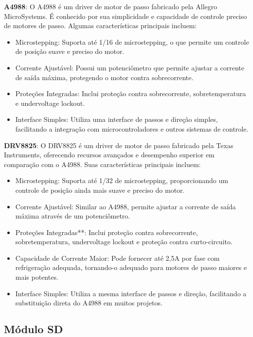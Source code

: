 \textbf{A4988}: O A4988 é um driver de motor de passo fabricado pela Allegro MicroSystems. É conhecido por sua simplicidade e capacidade de controle preciso de motores de passo. Algumas características principais incluem:

\begin{itemize}
    \item Microstepping: Suporta até 1/16 de microstepping, o que permite um controle de posição suave e preciso do motor.
    \item Corrente Ajustável: Possui um potenciômetro que permite ajustar a corrente de saída máxima, protegendo o motor contra sobrecorrente.
    \item Proteções Integradas: Inclui proteção contra sobrecorrente, sobretemperatura e undervoltage lockout.
    \item Interface Simples: Utiliza uma interface de passos e direção simples, facilitando a integração com microcontroladores e outros sistemas de controle.
\end{itemize}


\textbf{DRV8825}: O DRV8825 é um driver de motor de passo fabricado pela Texas Instruments, oferecendo recursos avançados e desempenho superior em comparação com o A4988. Suas características principais incluem:

\begin{itemize}
    \item Microstepping: Suporta até 1/32 de microstepping, proporcionando um controle de posição ainda mais suave e preciso do motor.
    \item Corrente Ajustável: Similar ao A4988, permite ajustar a corrente de saída máxima através de um potenciômetro.
    \item Proteções Integradas**: Inclui proteção contra sobrecorrente, sobretemperatura, undervoltage lockout e proteção contra curto-circuito.
    \item Capacidade de Corrente Maior: Pode fornecer até 2,5A por fase com refrigeração adequada, tornando-o adequado para motores de passo maiores e mais potentes.
    \item Interface Simples: Utiliza a mesma interface de passos e direção, facilitando a substituição direta do A4988 em muitos projetos.
\end{itemize}

\subsection{Módulo SD}

